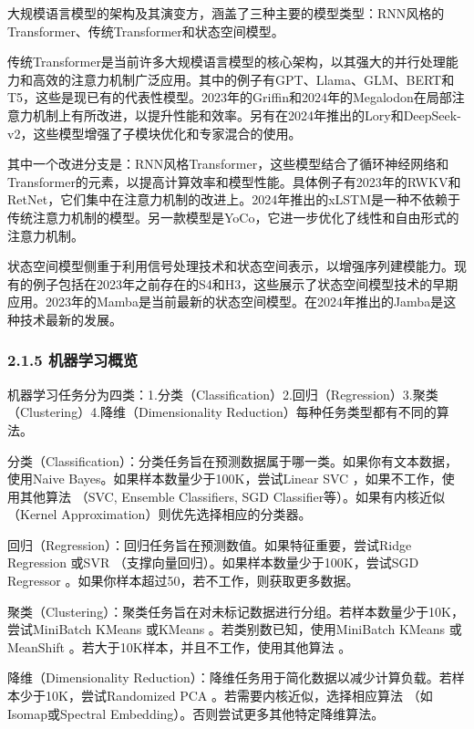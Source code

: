 大规模语言模型的架构及其演变方，涵盖了三种主要的模型类型：RNN风格的Transformer、传统Transformer和状态空间模型。

传统Transformer是当前许多大规模语言模型的核心架构，以其强大的并行处理能力和高效的注意力机制广泛应用。其中的例子有GPT、Llama、GLM、BERT和T5，这些是现已有的代表性模型。2023年的Griffin和2024年的Megalodon在局部注意力机制上有所改进，以提升性能和效率。另有在2024年推出的Lory和DeepSeek-v2，这些模型增强了子模块优化和专家混合的使用。

其中一个改进分支是：RNN风格Transformer，这些模型结合了循环神经网络和Transformer的元素，以提高计算效率和模型性能。具体例子有2023年的RWKV和RetNet，它们集中在注意力机制的改进上。2024年推出的xLSTM是一种不依赖于传统注意力机制的模型。另一款模型是YoCo，它进一步优化了线性和自由形式的注意力机制。

状态空间模型侧重于利用信号处理技术和状态空间表示，以增强序列建模能力。现有的例子包括在2023年之前存在的S4和H3，这些展示了状态空间模型技术的早期应用。2023年的Mamba是当前最新的状态空间模型。在2024年推出的Jamba是这种技术最新的发展。

\subsubsection{\texorpdfstring{\textbf{2.1.5
机器学习概览}}{2.1.5 机器学习概览}}\label{215-ux673aux5668ux5b66ux4e60ux6982ux89c8}

机器学习任务分为四类：1.分类（Classification）2.回归（Regression）3.聚类（Clustering）4.降维（Dimensionality
Reduction）每种任务类型都有不同的算法。

分类（Classification）：分类任务旨在预测数据属于哪一类。如果你有文本数据，使用Naive
Bayes。如果样本数量少于100K，尝试Linear SVC ，如果不工作，使用其他算法
（SVC, Ensemble Classifiers, SGD Classifier等）。如果有内核近似（Kernel
Approximation）则优先选择相应的分类器。

回归（Regression）：回归任务旨在预测数值。如果特征重要，尝试Ridge
Regression 或SVR （支撑向量回归）。如果样本数量少于100K，尝试SGD
Regressor 。如果你样本超过50，若不工作，则获取更多数据。

聚类（Clustering）：聚类任务旨在对未标记数据进行分组。若样本数量少于10K，尝试MiniBatch
KMeans 或KMeans 。若类别数已知，使用MiniBatch KMeans 或MeanShift
。若大于10K样本，并且不工作，使用其他算法 。

降维（Dimensionality
Reduction）：降维任务用于简化数据以减少计算负载。若样本少于10K，尝试Randomized
PCA 。若需要内核近似，选择相应算法 （如Isomap或Spectral
Embedding）。否则尝试更多其他特定降维算法。

